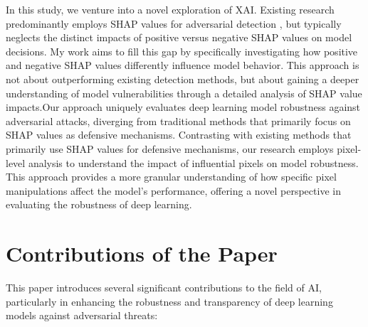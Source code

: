 \documentclass[10pt, conference, a4paper, final]{IEEEtran}
\begin{document}
In this study, we venture into a novel exploration of XAI. Existing research predominantly employs SHAP values for adversarial detection  \cite{Fidel, LinY, Stiff, E.Mosca, Tcydenova}, but typically neglects the distinct impacts of positive versus negative SHAP values on model decisions. My work aims to fill this gap by specifically investigating how positive and negative SHAP values differently influence model behavior. This approach is not about outperforming existing detection methods, but about gaining a deeper understanding of model vulnerabilities through a detailed analysis of SHAP value impacts.Our approach uniquely evaluates deep learning model robustness against adversarial attacks, diverging from traditional methods that primarily focus on SHAP values as defensive mechanisms. Contrasting with existing methods that primarily use SHAP values for defensive mechanisms, our research employs pixel-level analysis to understand the impact of influential pixels on model robustness. This approach provides a more granular understanding of how specific pixel manipulations affect the model's performance, offering a novel perspective in evaluating the robustness of deep learning.


\section{Contributions of the Paper}

This paper introduces several significant contributions to the field of AI, particularly in enhancing the robustness and transparency of deep learning models against adversarial threats:
\end{document}
